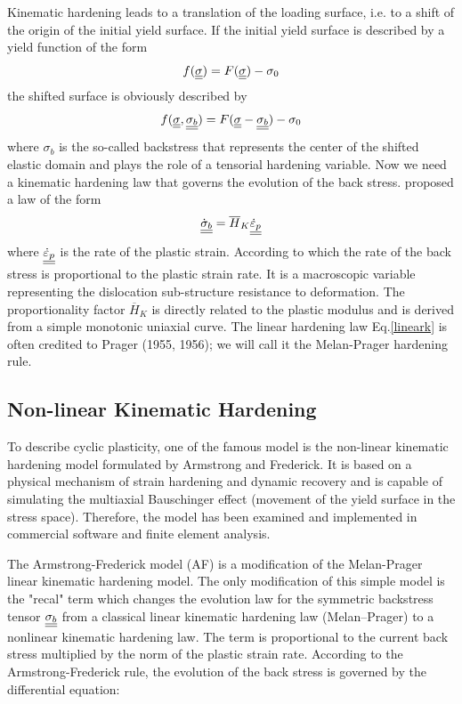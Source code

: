 Kinematic hardening leads to a translation of the loading surface, i.e. to a shift of
the origin of the initial yield surface. If the initial yield surface is described by a yield
function of the form
$$f(\uline{\uline{\sigma}}) = F(\uline{\uline{\sigma}}) -\sigma_0 $$
the shifted surface is obviously described by
$$f(\uline{\uline{\sigma}},\uline{\uline{\sigma_b}} ) = F(\uline{\uline{\sigma}}-\uline{\uline{\sigma_b}} ) -\sigma_0$$
where $\sigma_b$ is the so-called backstress that represents the center of the shifted elastic
domain and plays the role of a tensorial hardening variable. Now we need a kinematic
hardening law that governs the evolution of the back stress. \cite{melan1938plastizitat} proposed
a law of the form
\begin{equation}
\uline{\uline{\dot{\sigma}_b}} =\overline{H}_K \uline{\uline{\dot{\varepsilon}_p}}
\label{lineark}
\end{equation}
where $ \uline{\uline{\dot{\varepsilon}_p}}$ is the rate of the plastic strain. According to which the rate of the back stress is proportional to the plastic strain rate. It is a macroscopic variable representing the dislocation sub-structure resistance to deformation. The proportionality factor $\overline{H}_K$ is directly related to the plastic modulus and is derived from a simple monotonic uniaxial curve. The linear hardening law Eq.\eqref{lineark} is often credited to Prager (1955, 1956); we will call it the Melan-Prager hardening rule. 
\subsection{Non-linear Kinematic Hardening}
To describe cyclic plasticity, one of the famous model is the non-linear kinematic hardening model formulated by Armstrong and Frederick. It is based on a physical mechanism of strain hardening and dynamic recovery and is capable of simulating the
multiaxial Bauschinger effect (movement of the yield surface in the stress space). Therefore, the model has been examined and implemented in commercial software and finite element analysis.

The Armstrong-Frederick model (AF) is a modification of the Melan-Prager linear kinematic hardening model. The only modification of this simple model is the "recal" term which changes the evolution law for the symmetric backstress tensor $\uline{\uline{\sigma_b}}$ from a classical linear kinematic hardening law (Melan–Prager) to a nonlinear kinematic hardening law. The term is proportional to the current back stress multiplied by the norm of the plastic strain rate. According to the Armstrong-Frederick rule, the evolution of the
back stress is governed by the differential equation:

